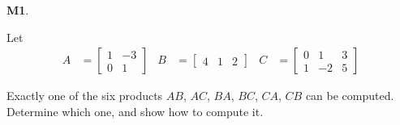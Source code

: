 \documentclass{article}
\newenvironment{problem}[1]
{
  \begin{flushleft}
  \textbf{#1}.
  \ignorespaces
}
{
  \end{flushleft}
}
\begin{document}
\begin{problem}{M1}
Let
\begin{align*}
A &= \begin{bmatrix} 1 & -3 \\ 0 & 1 \end{bmatrix} & B&= \begin{bmatrix} 4 & 1 & 2 \end{bmatrix} & C&= \begin{bmatrix} 0 & 1 & 3 \\ 1 & -2 & 5 \end{bmatrix}
\end{align*}

Exactly one of the six products $AB$, $AC$, $BA$, $BC$, $CA$, $CB$ can be computed.  Determine which one, and show how to compute it.
\end{problem}
\end{document}
